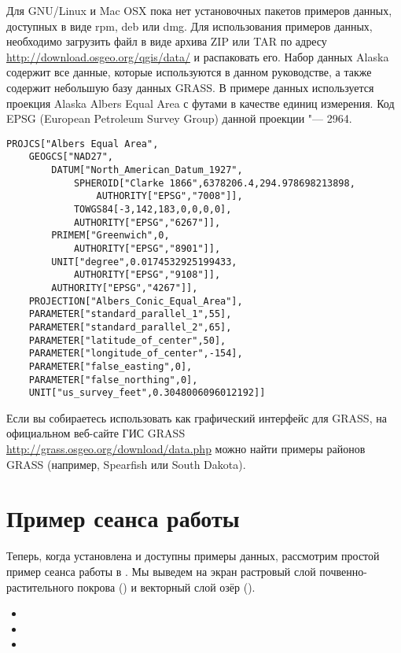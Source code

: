 \nix \osx Для GNU/Linux и Mac OSX пока нет установочных пакетов
примеров данных, доступных в виде rpm, deb или dmg. Для использования
примеров данных, необходимо загрузить файл 
в виде архива ZIP или TAR по адресу
\url{http://download.osgeo.org/qgis/data/} и распаковать его. Набор
данных Alaska содержит все данные, которые используются в данном руководстве,
а также содержит небольшую базу данных GRASS. В примере данных используется
проекция Alaska Albers Equal Area с футами в качестве единиц измерения.
Код EPSG (European Petroleum Survey Group) данной проекции "--- 2964.

\begin{verbatim}
PROJCS["Albers Equal Area",
    GEOGCS["NAD27",
        DATUM["North_American_Datum_1927",
            SPHEROID["Clarke 1866",6378206.4,294.978698213898,
                AUTHORITY["EPSG","7008"]],
            TOWGS84[-3,142,183,0,0,0,0],
            AUTHORITY["EPSG","6267"]],
        PRIMEM["Greenwich",0,
            AUTHORITY["EPSG","8901"]],
        UNIT["degree",0.0174532925199433,
            AUTHORITY["EPSG","9108"]],
        AUTHORITY["EPSG","4267"]],
    PROJECTION["Albers_Conic_Equal_Area"],
    PARAMETER["standard_parallel_1",55],
    PARAMETER["standard_parallel_2",65],
    PARAMETER["latitude_of_center",50],
    PARAMETER["longitude_of_center",-154],
    PARAMETER["false_easting",0],
    PARAMETER["false_northing",0],
    UNIT["us_survey_feet",0.3048006096012192]]
\end{verbatim}

Если вы собираетесь использовать \qg как графический интерфейс для
GRASS, на официальном веб-сайте ГИС GRASS \\
\url{http://grass.osgeo.org/download/data.php} можно найти примеры
районов GRASS (например, Spearfish или South Dakota).

\section{Пример сеанса работы}\label{samplesession}

Теперь, когда \qg установлена и доступны примеры данных, рассмотрим
простой пример сеанса работы в \qg. Мы выведем на экран растровый слой почвенно-растительного покрова () и векторный слой озёр ().


\begin{itemize}[label=--]
\item {}
\item {}
\item {}
\end{itemize}

